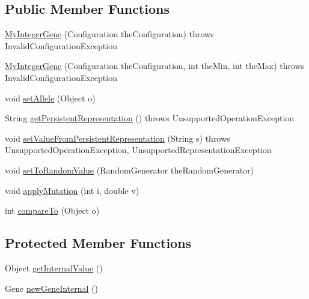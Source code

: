 \subsection*{Public Member Functions}
\begin{DoxyCompactItemize}
\item 
\hyperlink{classexamples_1_1math_1_1ga_1_1_my_integer_gene_ae5575c26782d69abf10b5242221ad7be}{My\-Integer\-Gene} (Configuration the\-Configuration)  throws Invalid\-Configuration\-Exception 
\item 
\hyperlink{classexamples_1_1math_1_1ga_1_1_my_integer_gene_aa924f1884aacde4f943fd9d79831dc0f}{My\-Integer\-Gene} (Configuration the\-Configuration, int the\-Min, int the\-Max)  throws Invalid\-Configuration\-Exception 
\item 
void \hyperlink{classexamples_1_1math_1_1ga_1_1_my_integer_gene_a3c81a28d074bf2a25386b5cfec958c2c}{set\-Allele} (Object o)
\item 
String \hyperlink{classexamples_1_1math_1_1ga_1_1_my_integer_gene_ae0825bfc8b2a2aee7e7ed683c7f34f0f}{get\-Persistent\-Representation} ()  throws Unsupported\-Operation\-Exception 
\item 
void \hyperlink{classexamples_1_1math_1_1ga_1_1_my_integer_gene_a869283ac8390ce41db50b010e6d4cd38}{set\-Value\-From\-Persistent\-Representation} (String s)  throws Unsupported\-Operation\-Exception, Unsupported\-Representation\-Exception 
\item 
void \hyperlink{classexamples_1_1math_1_1ga_1_1_my_integer_gene_a92d7268a1d5f1293026249c4a6d631e5}{set\-To\-Random\-Value} (Random\-Generator the\-Random\-Generator)
\item 
void \hyperlink{classexamples_1_1math_1_1ga_1_1_my_integer_gene_a893010efdbc0a80ca6ed9ce66988e3df}{apply\-Mutation} (int i, double v)
\item 
int \hyperlink{classexamples_1_1math_1_1ga_1_1_my_integer_gene_a6b572b7745a4aa2936a6f560c2b6811d}{compare\-To} (Object o)
\end{DoxyCompactItemize}
\subsection*{Protected Member Functions}
\begin{DoxyCompactItemize}
\item 
Object \hyperlink{classexamples_1_1math_1_1ga_1_1_my_integer_gene_ade200e0f1f83f21e93b47cc46e0605bb}{get\-Internal\-Value} ()
\item 
Gene \hyperlink{classexamples_1_1math_1_1ga_1_1_my_integer_gene_af974c78da1b0159fb4f0bc8107014e8c}{new\-Gene\-Internal} ()
\end{DoxyCompactItemize}
